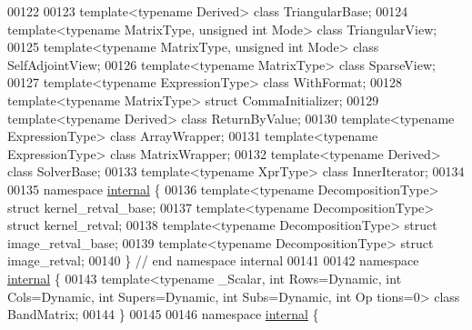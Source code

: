 \begin{DoxyCode}
00122 
00123 \textcolor{keyword}{template}<\textcolor{keyword}{typename} Derived> \textcolor{keyword}{class }TriangularBase;
00124 \textcolor{keyword}{template}<\textcolor{keyword}{typename} MatrixType, \textcolor{keywordtype}{unsigned} \textcolor{keywordtype}{int} Mode> \textcolor{keyword}{class }TriangularView;
00125 \textcolor{keyword}{template}<\textcolor{keyword}{typename} MatrixType, \textcolor{keywordtype}{unsigned} \textcolor{keywordtype}{int} Mode> \textcolor{keyword}{class }SelfAdjointView;
00126 \textcolor{keyword}{template}<\textcolor{keyword}{typename} MatrixType> \textcolor{keyword}{class }SparseView;
00127 \textcolor{keyword}{template}<\textcolor{keyword}{typename} ExpressionType> \textcolor{keyword}{class }WithFormat;
00128 \textcolor{keyword}{template}<\textcolor{keyword}{typename} MatrixType> \textcolor{keyword}{struct }CommaInitializer;
00129 \textcolor{keyword}{template}<\textcolor{keyword}{typename} Derived> \textcolor{keyword}{class }ReturnByValue;
00130 \textcolor{keyword}{template}<\textcolor{keyword}{typename} ExpressionType> \textcolor{keyword}{class }ArrayWrapper;
00131 \textcolor{keyword}{template}<\textcolor{keyword}{typename} ExpressionType> \textcolor{keyword}{class }MatrixWrapper;
00132 \textcolor{keyword}{template}<\textcolor{keyword}{typename} Derived> \textcolor{keyword}{class }SolverBase;
00133 \textcolor{keyword}{template}<\textcolor{keyword}{typename} XprType> \textcolor{keyword}{class }InnerIterator;
00134 
00135 \textcolor{keyword}{namespace }\hyperlink{namespaceinternal}{internal} \{
00136 \textcolor{keyword}{template}<\textcolor{keyword}{typename} DecompositionType> \textcolor{keyword}{struct }kernel\_retval\_base;
00137 \textcolor{keyword}{template}<\textcolor{keyword}{typename} DecompositionType> \textcolor{keyword}{struct }kernel\_retval;
00138 \textcolor{keyword}{template}<\textcolor{keyword}{typename} DecompositionType> \textcolor{keyword}{struct }image\_retval\_base;
00139 \textcolor{keyword}{template}<\textcolor{keyword}{typename} DecompositionType> \textcolor{keyword}{struct }image\_retval;
00140 \} \textcolor{comment}{// end namespace internal}
00141 
00142 \textcolor{keyword}{namespace }\hyperlink{namespaceinternal}{internal} \{
00143 \textcolor{keyword}{template}<\textcolor{keyword}{typename} \_Scalar, \textcolor{keywordtype}{int} Rows=Dynamic, \textcolor{keywordtype}{int} Cols=Dynamic, \textcolor{keywordtype}{int} Supers=Dynamic, \textcolor{keywordtype}{int} Subs=Dynamic, \textcolor{keywordtype}{int} Op
      tions=0> \textcolor{keyword}{class }BandMatrix;
00144 \}
00145 
00146 \textcolor{keyword}{namespace }\hyperlink{namespaceinternal}{internal} \{

\end{DoxyCode}
